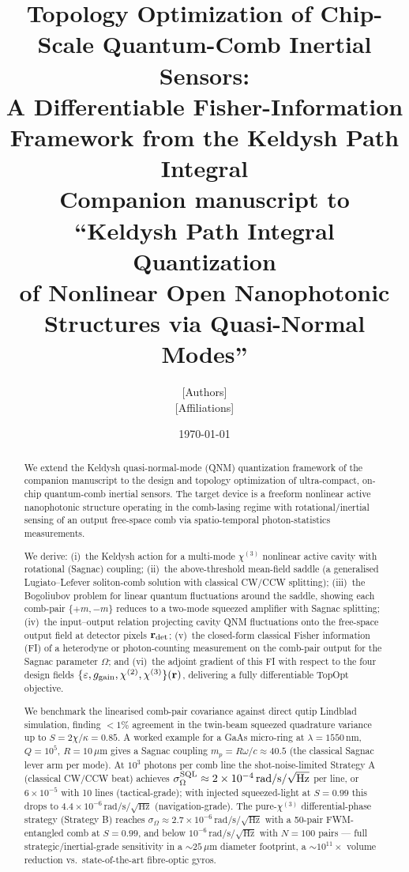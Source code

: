 \documentclass[11pt]{article}
\title{\textbf{Topology Optimization of Chip-Scale Quantum-Comb Inertial Sensors:\\[0.2em]
A Differentiable Fisher-Information Framework from the Keldysh Path Integral}\\[0.3em]
\large Companion manuscript to ``Keldysh Path Integral Quantization\\
of Nonlinear Open Nanophotonic Structures via Quasi-Normal Modes''}
\author{[Authors]\\\small[Affiliations]}
\date{\today}
\begin{document}
\maketitle

\begin{abstract}
We extend the Keldysh quasi-normal-mode (QNM) quantization framework
of the companion manuscript to the design and topology optimization of
ultra-compact, on-chip quantum-comb inertial sensors.  The target device
is a freeform nonlinear active nanophotonic structure operating in the
comb-lasing regime with rotational/inertial sensing of an output
free-space comb via spatio-temporal photon-statistics measurements.

We derive: (i)~the Keldysh action for a multi-mode $\chi^{(3)}$
nonlinear active cavity with rotational (Sagnac) coupling; (ii)~the
above-threshold mean-field saddle (a generalised Lugiato--Lefever
soliton-comb solution with classical CW/CCW splitting); (iii)~the
Bogoliubov problem for linear quantum fluctuations around the saddle,
showing each comb-pair $\{+m,-m\}$ reduces to a two-mode squeezed
amplifier with Sagnac splitting; (iv)~the input--output relation
projecting cavity QNM fluctuations onto the free-space output field at
detector pixels $\mathbf{r}_{\rm det}$; (v)~the closed-form classical
Fisher information (FI) of a heterodyne or photon-counting measurement
on the comb-pair output for the Sagnac parameter $\Omega$; and (vi)~the
adjoint gradient of this FI with respect to the four design fields
$\{\varepsilon, g_{\rm gain}, \chi^{(2)}, \chi^{(3)}\}(\mathbf{r})$,
delivering a fully differentiable TopOpt objective.

We benchmark the linearised comb-pair covariance against direct
qutip Lindblad simulation, finding $<1\%$ agreement in the
twin-beam squeezed quadrature variance up to $S=2\chi/\kappa = 0.85$.
A worked example for a GaAs micro-ring at $\lambda=1550\,\mathrm{nm}$,
$Q=10^5$, $R=10\,\mu\mathrm{m}$ gives a Sagnac coupling
$m_p = R\omega/c \approx 40.5$ (the classical Sagnac lever arm per
mode).  At $10^3$ photons per comb line the shot-noise-limited
Strategy A (classical CW/CCW beat) achieves
$\sigma_\Omega^{\rm SQL}\approx 2\times 10^{-4}\,\mathrm{rad/s}/\sqrt{\mathrm{Hz}}$
per line, or $6\times 10^{-5}$ with 10 lines (tactical-grade); with
injected squeezed-light at $S=0.99$ this drops to
$4.4\times 10^{-6}\,\mathrm{rad/s}/\sqrt{\mathrm{Hz}}$ (navigation-grade).
The pure-$\chi^{(3)}$ differential-phase strategy (Strategy B) reaches
$\sigma_\Omega\approx 2.7\times 10^{-6}\,\mathrm{rad/s}/\sqrt{\mathrm{Hz}}$
with a 50-pair FWM-entangled comb at $S=0.99$, and below
$10^{-6}\,\mathrm{rad/s}/\sqrt{\mathrm{Hz}}$ with $N=100$ pairs ---
full strategic/inertial-grade sensitivity in a $\sim\!25\,\mu\mathrm{m}$
diameter footprint, a $\sim\!10^{11}\times$ volume reduction vs.\
state-of-the-art fibre-optic gyros.


\end{abstract}
\end{document}
